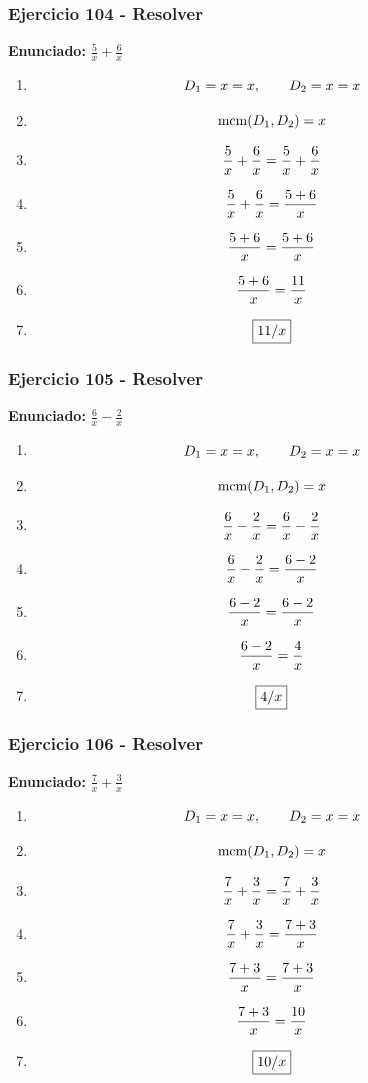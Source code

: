 \documentclass[11pt,a4paper]{article}
\newcommand{\fitmath}[1]{%
\[
\setbox0=\hbox{$\displaystyle #1$}%
\ifdim\wd0>\linewidth
\resizebox{\linewidth}{!}{$\displaystyle #1$}%
\else
#1%
\fi
\]
}
\begin{document}
\subsubsection*{Ejercicio 104 - Resolver}
\textbf{Enunciado:} $ \frac{5}{x} + \frac{6}{x} $\par
\begin{enumerate}[leftmargin=2em]
\item \fitmath{D_1=x=x,\qquad D_2=x=x}
\item \fitmath{\operatorname{mcm}(D_1,D_2)=x}
\item \fitmath{\frac{5}{x} + \frac{6}{x}= \frac{5}{x} + \frac{6}{x}}
\item \fitmath{\frac{5}{x} + \frac{6}{x}=\frac{5 + 6}{x}}
\item \fitmath{\frac{5 + 6}{x}=\frac{5 + 6}{x}}
\item \fitmath{\frac{5 + 6}{x}=\frac{11}{x}}
\item \fitmath{\boxed{11 / x}}
\end{enumerate}

\vspace{0.12cm}
\subsubsection*{Ejercicio 105 - Resolver}
\textbf{Enunciado:} $ \frac{6}{x} - \frac{2}{x} $\par
\begin{enumerate}[leftmargin=2em]
\item \fitmath{D_1=x=x,\qquad D_2=x=x}
\item \fitmath{\operatorname{mcm}(D_1,D_2)=x}
\item \fitmath{\frac{6}{x} - \frac{2}{x}= \frac{6}{x} - \frac{2}{x}}
\item \fitmath{\frac{6}{x} - \frac{2}{x}=\frac{6 - 2}{x}}
\item \fitmath{\frac{6 - 2}{x}=\frac{6 - 2}{x}}
\item \fitmath{\frac{6 - 2}{x}=\frac{4}{x}}
\item \fitmath{\boxed{4 / x}}
\end{enumerate}

\vspace{0.12cm}
\subsubsection*{Ejercicio 106 - Resolver}
\textbf{Enunciado:} $ \frac{7}{x} + \frac{3}{x} $\par
\begin{enumerate}[leftmargin=2em]
\item \fitmath{D_1=x=x,\qquad D_2=x=x}
\item \fitmath{\operatorname{mcm}(D_1,D_2)=x}
\item \fitmath{\frac{7}{x} + \frac{3}{x}= \frac{7}{x} + \frac{3}{x}}
\item \fitmath{\frac{7}{x} + \frac{3}{x}=\frac{7 + 3}{x}}
\item \fitmath{\frac{7 + 3}{x}=\frac{7 + 3}{x}}
\item \fitmath{\frac{7 + 3}{x}=\frac{10}{x}}
\item \fitmath{\boxed{10 / x}}
\end{enumerate}
\end{document}

